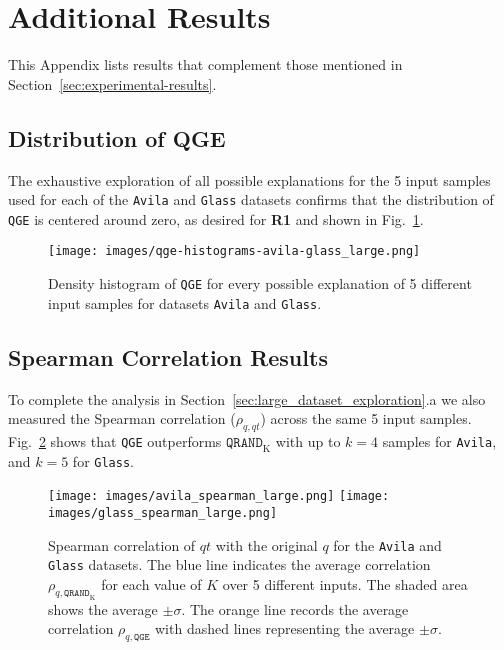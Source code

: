 \section{Additional Results}
This Appendix lists results that complement those mentioned in Section~\ref{sec:experimental-results}.

\subsection{Distribution of QGE}\label{sec:distribution-qge}
The exhaustive exploration of all possible explanations for the 5 input samples used for each of the \texttt{Avila} and \texttt{Glass} datasets confirms that the distribution of \texttt{QGE} is centered around zero, as desired for \textbf{R1} and shown in Fig.~\ref{fig:qge_distribution}.

\begin{figure}[htbp]
    \centering
    \texttt{[image: images/qge-histograms-avila-glass\_large.png]}
    \caption{Density histogram of \texttt{QGE} for every possible explanation of 5 different input samples for datasets \texttt{Avila} and \texttt{Glass}.}
    \label{fig:qge_distribution}
\end{figure}

\subsection{Spearman Correlation Results}\label{sec:exhaustive-spearman}
\normalsize
To complete the analysis in Section~\ref{sec:large_dataset_exploration}.a we also measured the Spearman correlation ($\rho_{q,qt}$) across the same 5 input samples. Fig.~\ref{fig:exhaustive_spearman} shows that \texttt{QGE} outperforms $\texttt{QRAND}_{\text{K}}$ with up to $k=4$ samples for \texttt{Avila}, and $k=5$ for \texttt{Glass}.

\begin{figure}[htbp]
    \centering
    \texttt{[image: images/avila\_spearman\_large.png]}
    \texttt{[image: images/glass\_spearman\_large.png]}
    \caption{Spearman correlation of $qt$ with the original $q$ for the \texttt{Avila} and \texttt{Glass} datasets. The blue line indicates the average correlation $\rho_{q,\texttt{QRAND}_{\text{K}}}$ for each value of $K$ over 5 different inputs. The shaded area shows the average $\pm\sigma$. The orange line records the average correlation $\rho_{q,\texttt{QGE}}$ with dashed lines representing the average $\pm\sigma$.}
    \label{fig:exhaustive_spearman}
\end{figure}

